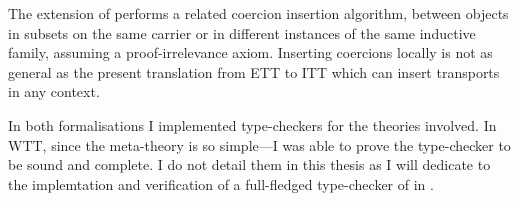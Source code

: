 The   extension of \Coq performs a
related coercion insertion algorithm, between objects in subsets on the
same carrier or in different instances of the same inductive family,
assuming a proof-irrelevance axiom. Inserting coercions locally is not
as general as the present translation from \acrshort{ETT} to \acrshort{ITT}
which can insert transports in any context.


In both formalisations I implemented type-checkers for the theories involved.
In \acrshort{WTT}, since the meta-theory is so simple---I was able to prove the
type-checker to be sound and complete. I do not detail them in this thesis as
I will dedicate  to the implemtation and verification of
a full-fledged type-checker of \Coq in \Coq.